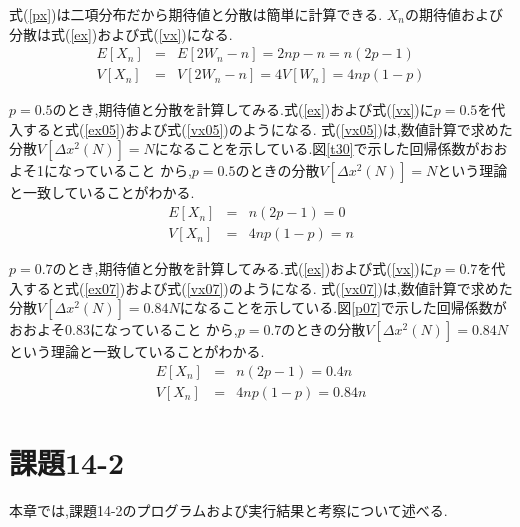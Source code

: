 \documentclass[a4j]{jarticle}
\begin{document}
          式(\ref{px})は二項分布だから期待値と分散は簡単に計算できる. $X_n$の期待値および分散は式(\ref{ex})および式(\ref{vx})になる.
          \begin{eqnarray}
            E[X_n] &=& E[2W_n -n] = 2np-n = n(2p-1) \label{ex} \\
            V[X_n] &=& V[2W_n -n] = 4V[W_n] = 4np(1-p) \label{vx}
          \end{eqnarray}

          $p=0.5$のとき,期待値と分散を計算してみる.式(\ref{ex})および式(\ref{vx})に$p=0.5$を代入すると式(\ref{ex05})および式(\ref{vx05})のようになる.
          式(\ref{vx05})は,数値計算で求めた分散$V[\Delta x^2(N)]=N$になることを示している.図\ref{t30}で示した回帰係数がおおよそ1になっていること
          から,$p=0.5$のときの分散$V[\Delta x^2(N)]=N$という理論と一致していることがわかる.
          \begin{eqnarray}
            E[X_n] &=&  n(2p-1) = 0 \label{ex05} \\
            V[X_n] &=& 4np(1-p) = n \label{vx05}
          \end{eqnarray}
        
          $p=0.7$のとき,期待値と分散を計算してみる.式(\ref{ex})および式(\ref{vx})に$p=0.7$を代入すると式(\ref{ex07})および式(\ref{vx07})のようになる.
          式(\ref{vx07})は,数値計算で求めた分散$V[\Delta x^2(N)]=0.84N$になることを示している.図\ref{p07}で示した回帰係数がおおよそ0.83になっていること
          から,$p=0.7$のときの分散$V[\Delta x^2(N)]=0.84N$という理論と一致していることがわかる.
          \begin{eqnarray}
            E[X_n] &=&  n(2p-1) = 0.4n \label{ex07} \\
            V[X_n] &=& 4np(1-p) = 0.84n \label{vx07}
          \end{eqnarray}
         
          \section{課題14-2}
          本章では,課題14-2のプログラムおよび実行結果と考察について述べる.
\end{document}

